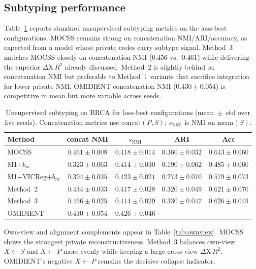 \subsection{Subtyping performance}

Table~\ref{tab:subtyping} reports standard unsupervised subtyping metrics on the loss-best configurations. MOCSS remains strong on concatenation NMI/ARI/accuracy, as expected from a model whose private codes carry subtype signal. Method~3 matches MOCSS closely on concatenation NMI ($0.456$ vs.\ $0.461$) while delivering the superior $\Delta\mathrm{X}\,R^{2}$ already discussed. Method~2 is slightly behind on concatenation NMI but preferable to Method~1 variants that sacrifice integration for lower private NMI. OMIDIENT concatenation NMI ($0.430\pm0.054$) is competitive in mean but more variable across seeds.

\begin{table}[htbp]
\centering
\caption{Unsupervised subtyping on BRCA for loss-best configurations (mean~$\pm$~std over five seeds). Concatenation metrics use $\mathrm{concat}(P,S)$; $s_{\mathrm{NMI}}$ is NMI on mean$(S)$.}
\label{tab:subtyping}
\begin{tabular}{lcccc}
\hline
Method & concat NMI & $s_{\mathrm{NMI}}$ & ARI & Acc \\
\hline
MOCSS & $0.461\pm0.008$ & $0.418\pm0.014$ & $0.360\pm0.032$ & $0.643\pm0.060$ \\
M1+$b_m$ & $0.323\pm0.063$ & $0.414\pm0.030$ & $0.190\pm0.062$ & $0.485\pm0.060$ \\
M1+VICReg+$b_m$ & $0.394\pm0.035$ & $0.423\pm0.021$ & $0.273\pm0.070$ & $0.579\pm0.073$ \\
Method~2 & $0.434\pm0.033$ & $0.417\pm0.028$ & $0.320\pm0.049$ & $0.621\pm0.070$ \\
Method~3 & $0.456\pm0.025$ & $0.414\pm0.029$ & $0.330\pm0.047$ & $0.626\pm0.049$ \\
OMIDIENT & $0.430\pm0.054$ & $0.426\pm0.046$ & --- & --- \\
\hline
\end{tabular}
\end{table}

Own-view and alignment complements appear in Table~\ref{tab:ownview}. MOCSS shows the strongest private reconstructiveness. Method~3 balances own-view $X\leftarrow S$ and $X\leftarrow P$ more evenly while keeping a large cross-view $\Delta\mathrm{X}\,R^{2}$. OMIDIENT's negative $X\leftarrow P$ remains the decisive collapse indicator.

